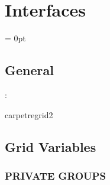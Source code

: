 
\section{Interfaces} 


\parskip = 0pt

\vspace{3mm} \subsection*{General}

: 

carpetregrid2
\vspace{2mm}
\subsection*{Grid Variables}
\vspace{5mm}\subsubsection{PRIVATE GROUPS}

\vspace{5mm}

